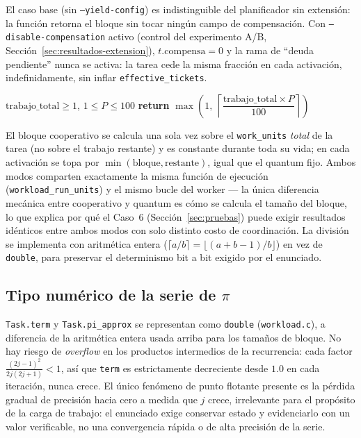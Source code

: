 El caso base (sin \texttt{--yield-config}) es indistinguible del planificador
sin extensión: la función retorna el bloque sin tocar ningún campo de
compensación. Con \texttt{--disable-compensation} activo (control del
experimento A/B, Sección~\ref{sec:resultados-extension}), $t.\text{compensa}
= 0$ y la rama de ``deuda pendiente'' nunca se activa: la tarea cede la misma
fracción en cada activación, indefinidamente, sin inflar
\texttt{effective\_tickets}.

\begin{algorithm}[htbp]
\caption{Tamaño de bloque cooperativo (\texttt{cooperative\_slice\_size})}
\label{alg:cooperativo}
\begin{algorithmic}[1]
\REQUIRE $\text{trabajo\_total} \ge 1$, $1 \le P \le 100$
\STATE \textbf{return} $\max\left(1,\ \left\lceil \dfrac{\text{trabajo\_total} \times P}{100} \right\rceil\right)$
\end{algorithmic}
\end{algorithm}

El bloque cooperativo se calcula una sola vez sobre el \texttt{work\_units}
\emph{total} de la tarea (no sobre el trabajo restante) y es constante
durante toda su vida; en cada activación se topa por
$\min(\text{bloque}, \text{restante})$, igual que el quantum fijo. Ambos
modos comparten exactamente la misma función de ejecución
(\texttt{workload\_run\_units}) y el mismo bucle del worker --- la única
diferencia mecánica entre cooperativo y quantum es cómo se calcula el
tamaño del bloque, lo que explica por qué el Caso~6 (Sección~\ref{sec:pruebas})
puede exigir resultados idénticos entre ambos modos con solo distinto costo
de coordinación. La división se implementa con aritmética entera
($\lceil a/b \rceil = \lfloor (a+b-1)/b \rfloor$) en vez de \texttt{double},
para preservar el determinismo bit a bit exigido por el enunciado.

\subsection{Tipo numérico de la serie de $\pi$}

\texttt{Task.term} y \texttt{Task.pi\_approx} se representan como
\texttt{double} (\texttt{workload.c}), a diferencia de la aritmética entera
usada arriba para los tamaños de bloque. No hay riesgo de \textit{overflow}
en los productos intermedios de la recurrencia: cada factor
$\frac{(2j-1)^2}{2j(2j+1)} < 1$, así que \texttt{term} es estrictamente
decreciente desde $1.0$ en cada iteración, nunca crece. El único fenómeno de
punto flotante presente es la pérdida gradual de precisión hacia cero a
medida que $j$ crece, irrelevante para el propósito de la carga de trabajo:
el enunciado exige conservar estado y evidenciarlo con un valor verificable,
no una convergencia rápida o de alta precisión de la serie.
